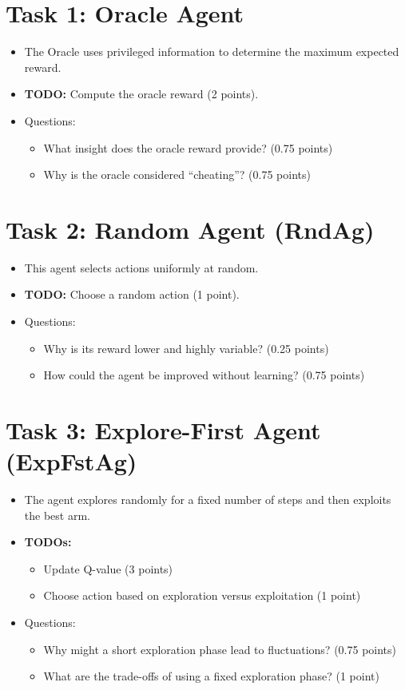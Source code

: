 \documentclass[12pt]{article}
\begin{document}
{{{\section{Task 1: Oracle Agent}
\begin{itemize}[noitemsep]
    \item The Oracle uses privileged information to determine the maximum expected reward.
    \item \textbf{TODO:} Compute the oracle reward (2 points).
    \item Questions:
    \begin{itemize}[noitemsep]
        \item What insight does the oracle reward provide? (0.75 points)
        \item Why is the oracle considered “cheating”? (0.75 points)
    \end{itemize}
\end{itemize}

\section{Task 2: Random Agent (RndAg)}
\begin{itemize}[noitemsep]
    \item This agent selects actions uniformly at random.
    \item \textbf{TODO:} Choose a random action (1 point).
    \item Questions:
    \begin{itemize}[noitemsep]
        \item Why is its reward lower and highly variable? (0.25 points)
        \item How could the agent be improved without learning? (0.75 points)
    \end{itemize}
\end{itemize}

\section{Task 3: Explore-First Agent (ExpFstAg)}
\begin{itemize}[noitemsep]
    \item The agent explores randomly for a fixed number of steps and then exploits the best arm.
    \item \textbf{TODOs:}
    \begin{itemize}[noitemsep]
        \item Update Q-value (3 points)
        \item Choose action based on exploration versus exploitation (1 point)
    \end{itemize}
    \item Questions:
    \begin{itemize}[noitemsep]
        \item Why might a short exploration phase lead to fluctuations? (0.75 points)
        \item What are the trade-offs of using a fixed exploration phase? (1 point)
    \end{itemize}
\end{itemize}

}}}
\end{document}
